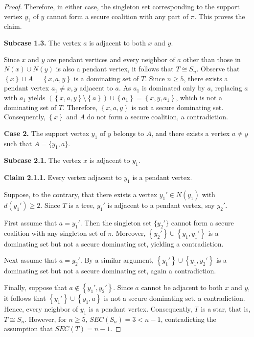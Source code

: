 \documentclass[12pt]{article}
\begin{document}
\begin{proof}
Therefore, in either case, the singleton set corresponding to the support vertex $y_1$ of $y$ cannot form a secure coalition with any part of $\pi$. This proves the claim.

\textbf{Subcase 1.3.} The vertex $a$ is adjacent to both $x$ and $y$.

Since $x$ and $y$ are pendant vertices and every neighbor of $a$ other than those in $N(x)\cup N(y)$ is also a pendant vertex, it follows that $T\cong S_n$.
Observe that $\left\{x\right\}\cup A=\left\{x,a,y\right\}$
is a dominating set of $T$. Since $n\ge 5$, there exists a pendant vertex $a_1\neq x,y$ adjacent to $a$. As $a_1$ is dominated only by $a$, replacing $a$ with $a_1$ yields
$(\left\{x,a,y\right\}\setminus\left\{a\right\})\cup\left\{a_1\right\}=\left\{x,y,a_1\right\}$, which is not a dominating set of $T$. Therefore, $\left\{x,a,y\right\}$ is not a secure dominating set. Consequently, $\left\{x\right\}$ and $A$ do not form a secure coalition, a contradiction.

\textbf{Case 2.} The support vertex $y_1$ of $y$ belongs to $A$, and there exists a vertex $a\neq y$ such that $A=\{y_1,a\}$.

\textbf{Subcase 2.1.} The vertex $x$ is adjacent to $y_1$.

\textbf{Claim 2.1.1.} Every vertex adjacent to $y_1$ is a pendant vertex.

Suppose, to the contrary, that there exists a vertex $y_1'\in N(y_1)$ with $d(y_1')\ge 2$. Since $T$ is a tree, $y_1'$ is adjacent to a pendant vertex, say $y_2'$.

First assume that $a=y_1'$. Then the singleton set $\{y_2'\}$ cannot form a secure coalition with any singleton set of $\pi$. Moreover,
$\left\{y_2'\right\}\cup\left\{y_1,y_1'\right\}$
is a dominating set but not a secure dominating set, yielding a contradiction.

Next assume that $a=y_2'$. By a similar argument,
$\left\{y_1'\right\}\cup\left\{y_1,y_2'\right\}$
is a dominating set but not a secure dominating set, again a contradiction.

Finally, suppose that $a\notin\left\{y_1',y_2'\right\}$. Since $a$ cannot be adjacent to both $x$ and $y$, it follows that
$\left\{y_1'\right\}\cup\left\{y_1,a\right\}$ is not a secure dominating set, a contradiction. Hence, every neighbor of $y_1$ is a pendant vertex. Consequently, $T$ is a star, that is,
$T\cong S_n$. However, for $n\ge 5$,
$SEC(S_n)=3<n-1$, contradicting the assumption that $SEC(T)=n-1$. 


\end{proof}
\end{document}
